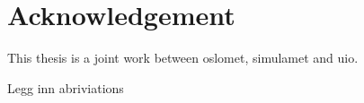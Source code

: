 \chapter*{Acknowledgement}

This thesis is a joint work between oslomet, simulamet and uio.

Legg inn abriviations


\cleardoublepage
